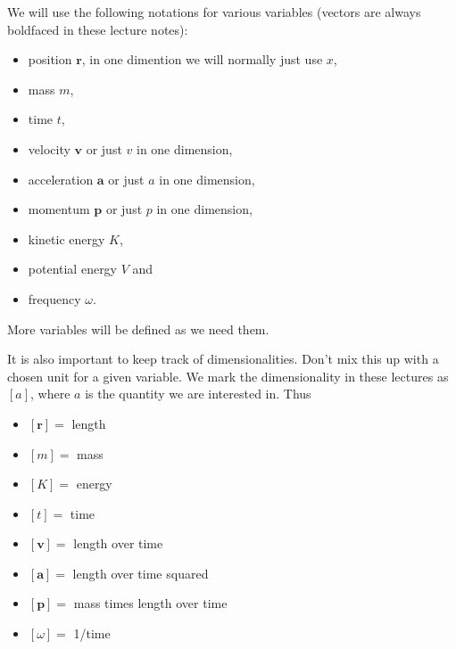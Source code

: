 \documentclass[letterpaper,10pt,english]{sphinxmanual}
\begin{document}
We will use the following notations for various variables (vectors are always boldfaced in these lecture notes):
\begin{itemize}
\item {} 
position \(\boldsymbol{r}\), in one dimention we will normally just use \(x\),

\item {} 
mass \(m\),

\item {} 
time \(t\),

\item {} 
velocity \(\boldsymbol{v}\) or just \(v\) in one dimension,

\item {} 
acceleration \(\boldsymbol{a}\) or just \(a\) in one dimension,

\item {} 
momentum \(\boldsymbol{p}\) or just \(p\) in one dimension,

\item {} 
kinetic energy \(K\),

\item {} 
potential energy \(V\) and

\item {} 
frequency \(\omega\).

\end{itemize}

More variables will be defined as we need them.

It is also important to keep track of dimensionalities. Don’t mix this up with a chosen unit for a given variable. We mark the dimensionality in these lectures as \([a]\), where \(a\) is the quantity we are interested in. Thus
\begin{itemize}
\item {} 
\([\boldsymbol{r}]=\) length

\item {} 
\([m]=\) mass

\item {} 
\([K]=\) energy

\item {} 
\([t]=\) time

\item {} 
\([\boldsymbol{v}]=\) length over time

\item {} 
\([\boldsymbol{a}]=\) length over time squared

\item {} 
\([\boldsymbol{p}]=\) mass times length over time

\item {} 
\([\omega]=\) 1/time

\end{itemize}
\end{document}
